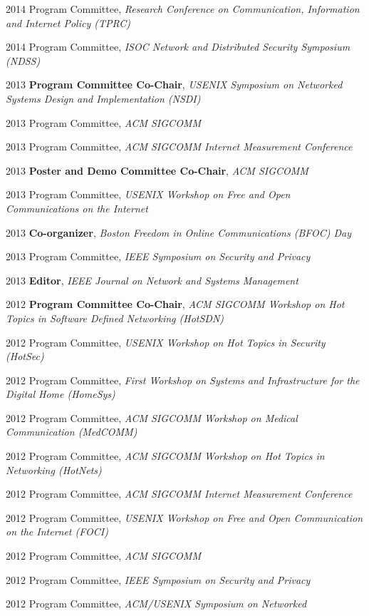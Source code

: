 \begin{cvlist}{}
\item[2014] Program Committee, {\em Research Conference on
  Communication, Information and Internet Policy (TPRC)}
\item[2014] Program Committee, {\em ISOC Network and Distributed
  Security Symposium (NDSS)}
\item[2013] {\bf Program Committee Co-Chair}, {\em USENIX Symposium on
  Networked Systems Design and Implementation (NSDI)}
\item[2013] {Program Committee}, {\em ACM SIGCOMM}
\item[2013] {Program Committee}, {\em ACM SIGCOMM Internet Measurement Conference}
\item[2013] {\bf Poster and Demo Committee Co-Chair}, {\em ACM SIGCOMM}
\item[2013] Program Committee, {\em USENIX Workshop on Free and Open
  Communications on the Internet}
\item[2013] {\bf Co-organizer}, {\em Boston Freedom in Online
  Communications (BFOC) Day}
\item[2013] Program Committee, {\em IEEE Symposium on Security and Privacy}
\item[2013] {\bf Editor}, {\em IEEE Journal on Network and Systems Management}
\item[2012] {\bf Program Committee Co-Chair}, {\em ACM SIGCOMM Workshop on Hot Topics
  in Software Defined Networking
(HotSDN)}
\item[2012] Program Committee, {\em USENIX Workshop on Hot Topics in
  Security (HotSec)}
\item[2012] Program Committee, {\em First Workshop on Systems and
  Infrastructure for the Digital Home (HomeSys)}
\item[2012] Program Committee, {\em ACM SIGCOMM Workshop on Medical
  Communication (MedCOMM)}
\item[2012] Program Committee, {\em ACM SIGCOMM Workshop on Hot Topics in Networking
(HotNets)}
\item[2012] Program Committee, {\em ACM SIGCOMM Internet Measurement Conference}
\item[2012] Program Committee, {\em USENIX Workshop on Free and Open
  Communication on the Internet (FOCI)}
\item[2012] Program Committee, {\em ACM SIGCOMM}
\item[2012] Program Committee, {\em IEEE Symposium on Security and
  Privacy}
\item[2012] Program Committee, {\em ACM/USENIX Symposium on Networked
}
\end{cvlist}

